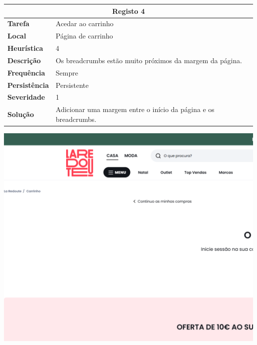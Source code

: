 \documentclass[a4paper,12pt]{article}
\begin{document}
\begin{center}
    \newpage
    \begin{table}[h!]
        \centering
        \begin{tabular}{|m{3cm}|m{12cm}|}
            \hline
            \multicolumn{2}{|c|}{\textbf{Registo 4}}                                                \\ \hline
            \textbf{Tarefa}       & Acedar ao carrinho                                              \\ \hline
            \textbf{Local}        & Página de carrinho                                              \\ \hline
            \textbf{Heurística}   & 4                                                               \\ \hline
            \textbf{Descrição}    & Os breadcrumbs estão muito próximos da margem da página.        \\ \hline
            \textbf{Frequência}   & Sempre                                                          \\ \hline
            \textbf{Persistência} & Persistente                                                     \\ \hline
            \textbf{Severidade}   & 1                                                               \\ \hline
            \textbf{Solução}      & Adicionar uma margem entre o início da página e os breadcrumbs. \\ \hline
        \end{tabular}
    \end{table}

    \vspace{0.5cm}
    \includegraphics[width=\textwidth, keepaspectratio]{heuristics/03breadcrumbs_carrinho.png}


\end{center}
\end{document}
